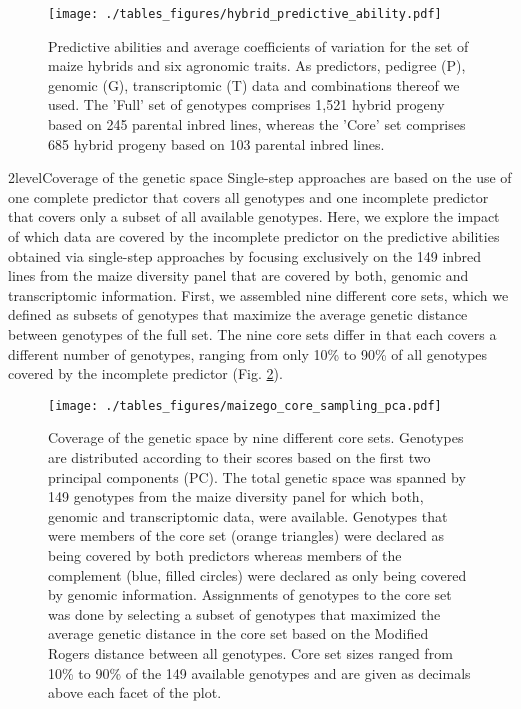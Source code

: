 \documentclass[12pt,titlepage]{article}
\begin{document}
\begin{figure}[H]
\centering
  \texttt{[image: ./tables\_figures/hybrid\_predictive\_ability.pdf]}
  \caption{
    Predictive abilities and average coefficients of variation for the set of 
    maize hybrids and six agronomic traits.
    As predictors, pedigree (P), genomic (G), transcriptomic (T) data and 
    combinations thereof we used.
    The 'Full' set of genotypes comprises 1,521 hybrid progeny based on 245
    parental inbred lines, whereas the 'Core' set comprises 685 hybrid progeny
    based on 103 parental inbred lines.
  } 
  \label{fig:HybridResults}
\end{figure}





\Genetics2level{Coverage of the genetic space}
Single-step approaches are based on the use of one complete predictor that
covers all genotypes and one incomplete predictor that covers only a subset of
all available genotypes.
Here, we explore the impact of which data are covered by the incomplete 
predictor on the predictive abilities obtained via single-step approaches by
focusing exclusively on the 149 inbred lines from the maize diversity panel
that are covered by both, genomic and transcriptomic information.
First, we assembled nine different core sets, which we defined as subsets
of genotypes that maximize the average genetic distance between genotypes of
the full set.
The nine core sets differ in that each covers a different number of genotypes,
ranging from only 10\% to 90\% of all genotypes covered by the incomplete
predictor (Fig. \ref{fig:CoreSetPCA}).



\begin{figure}[H]
\centering
\texttt{[image: ./tables\_figures/maizego\_core\_sampling\_pca.pdf]}
\caption{
  Coverage of the genetic space by nine different core sets. 
  Genotypes are distributed according to their scores based on the first two
  principal components (PC).
  The total genetic space was spanned by 149 genotypes from the maize diversity 
  panel for which both, genomic and transcriptomic data, were available.
  Genotypes that were members of the core set (orange triangles) were declared 
  as being covered by both predictors whereas members of the complement (blue,
  filled circles) were declared as only being covered by genomic information.
  Assignments of genotypes to the core set was done by selecting a subset of
  genotypes that maximized the average genetic distance in the core set based 
  on the Modified Rogers distance between all genotypes.
  Core set sizes ranged from 10\% to 90\% of the 149 available genotypes and
  are given as decimals above each facet of the plot.
}
\label{fig:CoreSetPCA}
\end{figure}
\end{document}

